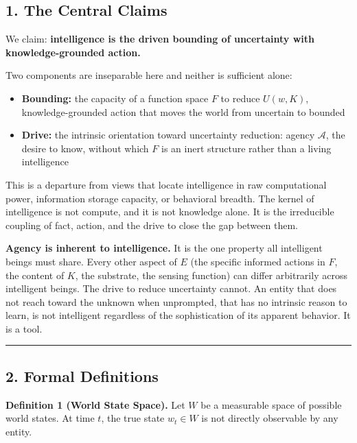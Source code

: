 \documentclass[
]{article}
\providecommand{\tightlist}{%
  \setlength{\itemsep}{0pt}\setlength{\parskip}{0pt}}
\begin{document}
\subsection{1. The Central Claims}\label{the-central-claims}

We claim: \textbf{intelligence is the driven bounding of uncertainty
with knowledge-grounded action.}

Two components are inseparable here and neither is sufficient alone:

\begin{itemize}
\tightlist
\item
  \textbf{Bounding:} the capacity of a function space \(F\) to reduce
  \(U(w, K)\), knowledge-grounded action that moves the world from
  uncertain to bounded
\item
  \textbf{Drive:} the intrinsic orientation toward uncertainty
  reduction: agency \(\mathcal{A}\), the desire to know, without which
  \(F\) is an inert structure rather than a living intelligence
\end{itemize}

This is a departure from views that locate intelligence in raw
computational power, information storage capacity, or behavioral
breadth. The kernel of intelligence is not compute, and it is not
knowledge alone. It is the irreducible coupling of fact, action, and the
drive to close the gap between them.

\textbf{Agency is inherent to intelligence.} It is the one property all
intelligent beings must share. Every other aspect of \(E\) (the specific
informed actions in \(F\), the content of \(K\), the substrate, the
sensing function) can differ arbitrarily across intelligent beings. The
drive to reduce uncertainty cannot. An entity that does not reach toward
the unknown when unprompted, that has no intrinsic reason to learn, is
not intelligent regardless of the sophistication of its apparent
behavior. It is a tool.

\begin{center}\rule{0.5\linewidth}{0.5pt}\end{center}

\subsection{2. Formal Definitions}\label{formal-definitions}

\textbf{Definition 1 (World State Space).} Let \(W\) be a measurable
space of possible world states. At time \(t\), the true state
\(w_t \in W\) is not directly observable by any entity.
\end{document}
